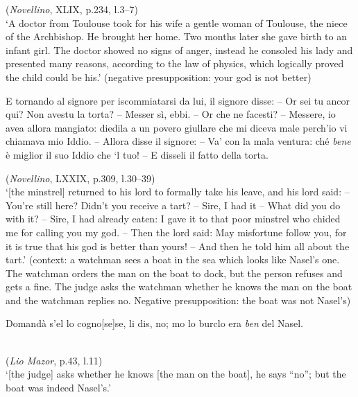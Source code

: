 \documentclass[output=paper]{langsci/langscibook}
\begin{document}
        (\emph{Novellino}, XLIX, p.234, l.3--7)\\
        \enquote*{A doctor from Toulouse took for his wife a gentle woman of Toulouse,
        the niece of the Archbishop. He brought her home. Two months later she
        gave birth to an infant girl. The doctor showed no signs of anger,
        instead he consoled his lady and presented many reasons, according to
    the law of physics, which logically proved the child could be his.}
	\z
\ex \label{ex:schifano:12.8}(negative presupposition: your god is not better)\\
    \begin{otherlanguage}{italian}
            E tornando al signore per iscommiatarsi da lui, il
            signore disse: – Or sei tu ancor qui? Non avestu la torta? – Messer
            sì, ebbi. – Or che ne facesti? – Messere, io avea allora mangiato:
            diedila a un povero giullare che mi diceva male perch’io vi
            chiamava mio Iddio. – Allora disse il signore: – Va’ con la mala
    ventura: ché \textit{bene} è miglior il suo Iddio che ‘l tuo! – E disseli
    il fatto della torta.
    \end{otherlanguage}\hfill
    (\emph{Novellino}, LXXIX, p.309, l.30--39)\\
    \enquote*{[the minstrel] returned to his lord to formally take his leave,
    and his lord said: -- You’re still here? Didn’t you receive a tart?
    -- Sire, I had it -- What did you do with it? -- Sire, I had already
    eaten: I gave it to that poor minstrel who chided me for calling you my
    god. -- Then the lord said: May misfortune follow you, for it is true that
    his god is better than yours! -- And then he told him all about the tart.}
\ex \label{ex:schifano:12.9}
    (context: a watchman sees a boat in the sea which looks like Nasel’s one.
    The watchman orders the man on the boat to dock, but the person refuses and
    gets a fine. The judge asks the watchman whether he knows the man on the
    boat and the watchman replies no. Negative presupposition: the boat was not
    Nasel’s)\\
    \begin{otherlanguage}{italian}
    Domandà s’el lo cogno[se]se, li dis, no; mo lo burclo
    era \textit{ben} del Nasel.\end{otherlanguage}\\
	(\emph{Lio Mazor}, p.43, l.11)\\
    \enquote*{[the judge] asks whether he knows [the man on the boat], he says
    ``no''; but the boat was indeed Nasel’s.}
\end{document}
